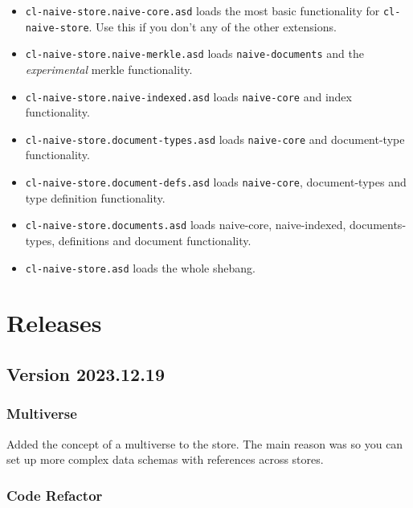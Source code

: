 \documentclass[11pt]{article}
\begin{document}
\begin{itemize}
\item \texttt{cl-naive-store.naive-core.asd} loads the most basic functionality for
\texttt{cl-naive-store}. Use this if you don't any of the other extensions.

\item \texttt{cl-naive-store.naive-merkle.asd} loads \texttt{naive-documents} and the
\emph{experimental} merkle functionality.

\item \texttt{cl-naive-store.naive-indexed.asd} loads \texttt{naive-core} and index
functionality.

\item \texttt{cl-naive-store.document-types.asd} loads \texttt{naive-core} and document-type
functionality.

\item \texttt{cl-naive-store.document-defs.asd} loads \texttt{naive-core}, document-types
and type definition functionality.

\item \texttt{cl-naive-store.documents.asd} loads naive-core, naive-indexed,
documents-types, definitions and document functionality.

\item \texttt{cl-naive-store.asd} loads the whole shebang.
\end{itemize}
\section{Releases}
\label{sec:org841eb11}

\subsection{Version 2023.12.19}
\label{sec:org8efcff7}

\subsubsection{Multiverse}
\label{sec:org2c0670f}

Added the concept of a multiverse to the store. The main reason was so
you can set up more complex data schemas with references across
stores.

\subsubsection{Code Refactor}
\label{sec:org9b24160}
\end{document}
